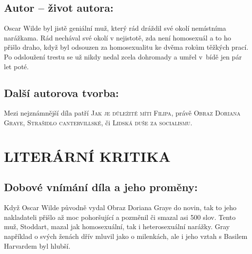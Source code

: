 \documentclass[A4paper]{extarticle} %
\begin{document}



\subsection*{Autor {\ssmall -- život autora:}}
\noindent 
Oscar Wilde byl jistě geniální muž, který rád dráždil své okolí nemístníma narážkama.
Rád nechával své okolí v nejistotě, zda není homosexuál a to ho přišlo draho, když byl odsouzen za homosexualitu ke dvěma rokům těžkých prací.
Po odsloužení trestu se už nikdy nedal zcela dohromady a umřel v~bídě jen pár let poté.


\subsection*{Další autorova tvorba:}
\noindent 
Mezi nejznámnější díla patří \textsc{Jak je důležité míti Filipa}, právě \textsc{Obraz Doriana Graye}, \textsc{Strašidlo cantervillské}, či \textsc{Lidská duše za socialismu}.


\section*{LITERÁRNÍ KRITIKA}

\subsection*{Dobové vnímání díla a jeho proměny:}
\noindent
Když Oscar Wilde původně vydal Obraz Doriana Graye do novin, tak to jeho nakladateli přišlo až moc pohoršující a pozměnil či smazal asi 500 slov.
Tento muž, Stoddart, mazal jak homosexuální, tak i heterosexuální narážky.
Gray například o svých ženách dřív mluvil jako o milenkách, ale i jeho vztah s Basilem Harvardem byl hlubší.
\end{document}
